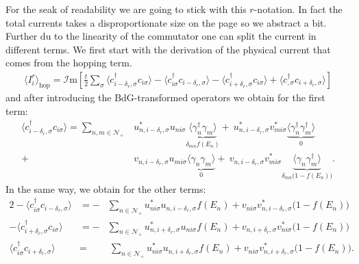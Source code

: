 \documentclass[../main.tex]{subfile}
\begin{document}
For the seak of readability we are going to stick with this $r$-notation. In fact the total currents takes a disproportionate size on the page so we abstract a bit.
Further du to the linearity of the commutator one can split the current in different terms. We first start with the derivation of the physical current
that comes from the hopping term.
\begin{equation*}
    \begin{aligned}
    \langle I_i^r\rangle_{\text{hop}} = \mathcal{I}\text{m}\left[ \frac{t}{2} \sum_{\sigma} 
        \langle c_{i-\delta_{r},\sigma}^{\dagger} c_{i\sigma}\rangle
        -\langle c_{i\sigma}^{\dagger}            c_{i-\delta_{r},\sigma}\rangle
        -\langle c_{i+\delta_{r},\sigma}^{\dagger} c_{i\sigma}\rangle
        +\langle c_{,\sigma}^{\dagger}            c_{i+\delta_{r},\sigma}\rangle\right]
\end{aligned}
\end{equation*}
and after introducing the BdG-transformed operators we obtain for the first term:
\begin{equation*}
    \begin{aligned}
    \langle c_{i-\delta_r,\sigma}^{\dagger} c_{i\sigma}\rangle = \sum_{n,m\in\mathcal{N}_+} 
        &u_{n,i-\delta_r,\sigma}^{\ast} u_{ni\sigma} \underbrace{\langle \gamma_n^{\dagger}\gamma_m\rangle}_{\delta_{mn}f(E_n)} 
        +~ u_{n,i-\delta_r,\sigma}^{\ast} v_{mi\sigma}^{\ast} \underbrace{\langle \gamma_n^{\dagger}\gamma_m^{\dagger}\rangle}_{0}\\
        +~& v_{n,i-\delta_r,\sigma}u_{mi\sigma}\underbrace{\langle \gamma_n\gamma_m\rangle}_{0}
        +~ v_{n,i-\delta_r,\sigma}v_{mi\sigma}^{\ast}\underbrace{\langle \gamma_n\gamma_m^{\dagger}\rangle}_{\delta_{mn}\bigl(1-f(E_n)\bigr)}.
    \end{aligned}
\end{equation*}
In the same way, we obtain for the other terms:
\begin{alignat*}{2}
    -\langle c_{i\sigma}^{\dagger}c_{i-\delta_{r},\sigma}\rangle &= -&\sum_{n\in\mathcal{N}_+} u_{ni\sigma}^{\ast}u_{n,i-\delta_r,\sigma} f(E_n) + v_{ni\sigma}v_{n,i-\delta_r,\sigma}^{\ast}\bigl(1-f(E_n)\bigr)\\
    -\langle c_{i+\delta_{r},\sigma}^{\dagger}c_{i\sigma}\rangle &= -&\sum_{n\in\mathcal{N}_+} u_{n,i+\delta_r,\sigma}^{\ast}u_{ni\sigma} f(E_n) + v_{n,i+\delta_r,\sigma}v_{ni\sigma}^{\ast}\bigl(1-f(E_n)\bigr)\\
     \langle c_{i\sigma}^{\dagger}c_{i+\delta_{r},\sigma}\rangle &=  &~\sum_{n\in\mathcal{N}_+} u_{ni\sigma}^{\ast}u_{n,i+\delta_r,\sigma} f(E_n) + v_{ni\sigma}v_{n,i+\delta_r,\sigma}^{\ast}\bigl(1-f(E_n)\bigr).
\end{alignat*}
\end{document}
